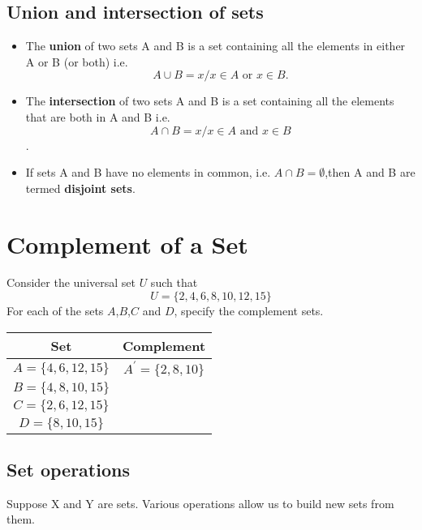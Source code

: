 \subsection*{Union and intersection of sets}

\begin{itemize}
\item The \textbf{union} of two sets A and B is a set containing all the elements in
either A or B (or both)
i.e. 
\[A \cup B = {x / x \in A \mbox{ or } x \in B}.\]
\item The \textbf{intersection} of two sets A and B is a set containing all the elements
that are both in A and B
i.e. 
\[A \cap B = {x / x \in A \mbox{ and }x \in B}\].

\item If sets A and B have no elements in common, i.e. $A \cap B = \emptyset$,then A and B
are termed \textbf{disjoint sets}.
\end{itemize}


\section*{Complement of a Set}
Consider the universal set $U$ such that
\[U=\{2,4,6,8,10,12,15\} \]
For each of the sets $A$,$B$,$C$ and $D$, specify the complement sets.
\begin{center}
\begin{tabular}{|c|c|}
\hline
Set & Complement\\
\hline $A=\{4,6,12,15\}$ &
$A^{\prime}=\{2,8,10\}$ \\ \hline $B=\{4,8,10,15\}$ & \\ \hline
$C=\{2,6,12,15\}$ & \\ \hline $D=\{8,10,15\}$ & \\ \hline

\end{tabular}
\end{center}

\subsection{Set operations}

Suppose X and Y are sets. Various operations allow us to build new sets from them.

